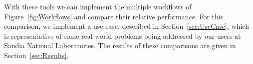 With these tools we can implement the multiple workflows of
Figure~\ref{fig:Workflows} and compare their relative performance.  For
this comparison, we implement a use case, described in
Section~\ref{sec:UseCase}, which is representative of some real-world
problems being addressed by our users at Sandia National Laboratories.  The
results of these comparisons are given in Section~\ref{sec:Results}.
